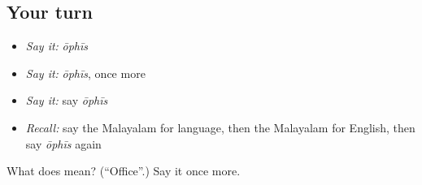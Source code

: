 \subsection*{Your turn}
\begin{itemize}
\raggedright
  \item \emph{Say it:} \emph{ōphīs}
  \item \emph{Say it:} \emph{ōphīs}, once more
  \item \emph{Say it:} say \emph{ōphīs}
  \item \emph{Recall:} say the Malayalam for language, then the Malayalam for English, then say \emph{ōphīs} again
\end{itemize}

\begin{tcolorbox}[breakable,colback=teal!4,colframe=teal!35!black,title={Before you move on}]
What does  mean? (\textquotedblleft{}Office\textquotedblright{}.) Say it once more.
\end{tcolorbox}
